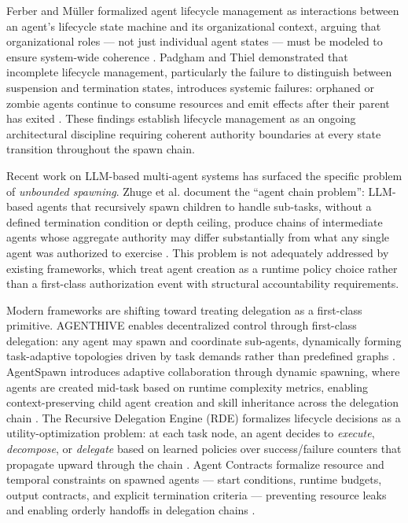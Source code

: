 Ferber and M\"uller formalized agent lifecycle management as interactions between an agent's lifecycle state machine and its organizational context, arguing that organizational roles — not just individual agent states — must be modeled to ensure system-wide coherence \cite{ferber1996}. Padgham and Thiel demonstrated that incomplete lifecycle management, particularly the failure to distinguish between suspension and termination states, introduces systemic failures: orphaned or zombie agents continue to consume resources and emit effects after their parent has exited \cite{padgham2001}. These findings establish lifecycle management as an ongoing architectural discipline requiring coherent authority boundaries at every state transition throughout the spawn chain.

Recent work on LLM-based multi-agent systems has surfaced the specific problem of \emph{unbounded spawning}. Zhuge et al. document the ``agent chain problem'': LLM-based agents that recursively spawn children to handle sub-tasks, without a defined termination condition or depth ceiling, produce chains of intermediate agents whose aggregate authority may differ substantially from what any single agent was authorized to exercise \cite{zhuge2024}. This problem is not adequately addressed by existing frameworks, which treat agent creation as a runtime policy choice rather than a first-class authorization event with structural accountability requirements.

Modern frameworks are shifting toward treating delegation as a first-class primitive. AGENTHIVE enables decentralized control through first-class delegation: any agent may spawn and coordinate sub-agents, dynamically forming task-adaptive topologies driven by task demands rather than predefined graphs \cite{agenthive2025}. AgentSpawn introduces adaptive collaboration through dynamic spawning, where agents are created mid-task based on runtime complexity metrics, enabling context-preserving child agent creation and skill inheritance across the delegation chain \cite{agentspawn2026}. The Recursive Delegation Engine (RDE) formalizes lifecycle decisions as a utility-optimization problem: at each task node, an agent decides to \emph{execute}, \emph{decompose}, or \emph{delegate} based on learned policies over success/failure counters that propagate upward through the chain \cite{rde2024}. Agent Contracts formalize resource and temporal constraints on spawned agents — start conditions, runtime budgets, output contracts, and explicit termination criteria — preventing resource leaks and enabling orderly handoffs in delegation chains \cite{agentcontracts2025}.

